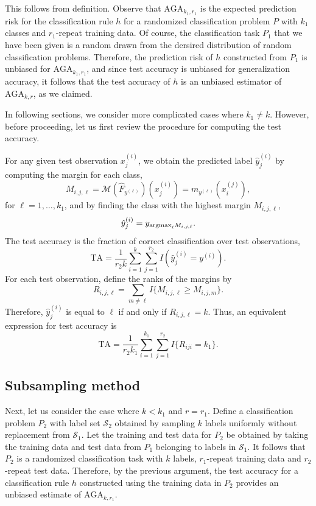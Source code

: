 This follows from definition.  Observe that $\text{AGA}_{k_1,r_1}$ is
the expected prediction risk for the classification rule $h$ for a
randomized classification problem $P$ with $k_1$ classes and
$r_1$-repeat training data.  Of course, the classification task $P_1$
that we have been given is a random drawn from the dersired
distribution of random classification problems.  Therefore, the
prediction risk of $h$ constructed from $P_1$ is unbiased for
$\text{AGA}_{k_1, r_1}$, and since test accuracy is unbiased for
generalization accuracy, it follows that the test accuracy of $h$ is
an unbiased estimator of $\text{AGA}_{k,r}$, as we claimed.

In following sections, we consider more complicated cases where $k_1
\neq k$.  However, before proceeding, let us first review the
procedure for computing the test accuracy.

For any given test observation $x_j^{(i)}$, we obtain the predicted
label $\hat{y}_j^{(i)}$ by computing the margin for each class,
\[
M_{i,j,\ell} = \mathcal{M}(\hat{F}_{y^{(\ell)}})(x_j^{(i)}) =  m_{y^{(\ell)}}(x_i^{(j)}),
\]
for $\ell = 1,\hdots, k_1$,
and by finding the class with the highest margin $M_{i, j, \ell}$,
\[
\hat{y}_j^{(i)} = y_{\text{argmax}_\ell M_{i, j, \ell}}.
\]
The test accuracy is the fraction of correct classification over test observations,
\begin{equation}
\text{TA} = \frac{1}{r_2k} \sum_{i=1}^k \sum_{j=1}^{r_2} I(\hat{y}_j^{(i)} = y^{(i)}).
\end{equation}
For each test observation, define the ranks of the margins by
\[
R_{i,j,\ell} = \sum_{m \neq \ell} I\{M_{i,j,\ell} \geq M_{i, j, m}\}.
\]
Therefore, $\hat{y}_j^{(i)}$ is equal to $\ell$ if and only if $R_{i,j,\ell} = k$.
Thus, an equivalent expression for test accuracy is
\begin{equation}\label{eq:test_risk}
\text{TA} = \frac{1}{r_2 k_1} \sum_{i=1}^{k_1} \sum_{j=1}^{r_2} I\{R_{iji} = k_1\}.
\end{equation}

\subsection{Subsampling method}

Next, let us consider the case where $k < k_1$ and $r=r_1$.  Define a
classification problem $P_2$ with label set $\mathcal{S}_2$ obtained
by sampling $k$ labels uniformly without replacement from
$\mathcal{S}_1$.  Let the training and test data for $P_2$ be obtained
by taking the training data and test data from $P_1$ belonging to
labels in $\mathcal{S}_1$.  It follows that $P_2$ is a randomized
classification task with $k$ labels, $r_1$-repeat training data and
$r_2$-repeat test data.  Therefore, by the previous argument, the test
accuracy for a classification rule $h$ constructed using the training data
in $P_2$ provides an unbiased estimate of $\text{AGA}_{k, r_1}$.

